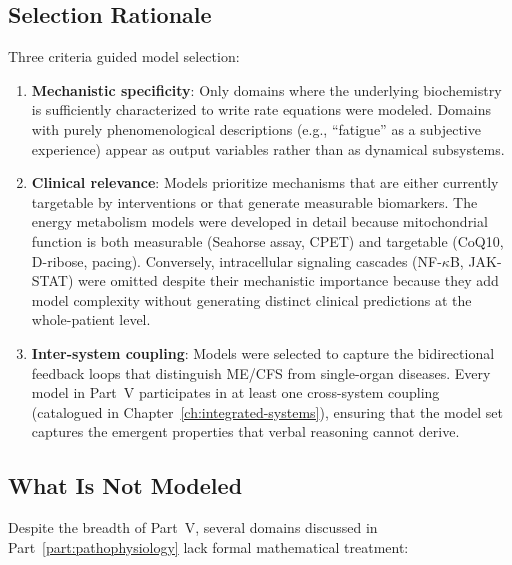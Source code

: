 \subsection{Selection Rationale}

Three criteria guided model selection:

\begin{enumerate}
    \item \textbf{Mechanistic specificity}: Only domains where the underlying biochemistry is sufficiently characterized to write rate equations were modeled. Domains with purely phenomenological descriptions (e.g., ``fatigue'' as a subjective experience) appear as output variables rather than as dynamical subsystems.
    \item \textbf{Clinical relevance}: Models prioritize mechanisms that are either currently targetable by interventions or that generate measurable biomarkers. The energy metabolism models were developed in detail because mitochondrial function is both measurable (Seahorse assay, CPET) and targetable (CoQ10, D-ribose, pacing). Conversely, intracellular signaling cascades (NF-$\kappa$B, JAK-STAT) were omitted despite their mechanistic importance because they add model complexity without generating distinct clinical predictions at the whole-patient level.
    \item \textbf{Inter-system coupling}: Models were selected to capture the bidirectional feedback loops that distinguish ME/CFS from single-organ diseases. Every model in Part~V participates in at least one cross-system coupling (catalogued in Chapter~\ref{ch:integrated-systems}), ensuring that the model set captures the emergent properties that verbal reasoning cannot derive.
\end{enumerate}

\subsection{What Is Not Modeled}


Despite the breadth of Part~V, several domains discussed in Part~\ref{part:pathophysiology} lack formal mathematical treatment:


